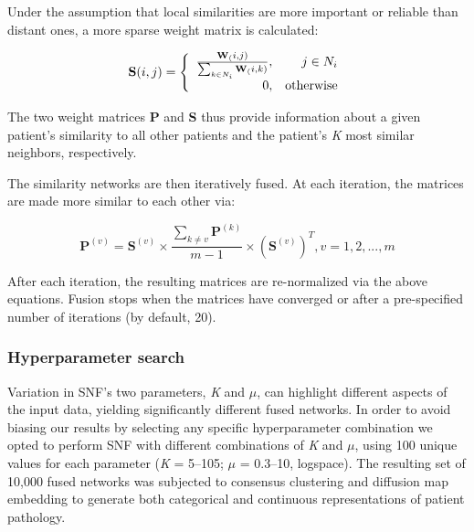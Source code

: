 \documentclass[12pt,aps,pra,reprint,showkeys]{revtex4-1}
\begin{document}
Under the assumption that local similarities are more important or reliable than distant ones, a more sparse weight matrix is calculated:

\begin{equation*}
    \mathbf{S}(i,j) =
     \left\{\begin{array}{r r}
       \frac{\mathbf{W}_(i,j)}
            {\sum_{k\in N_{i}}^{}\mathbf{W}_(i,k)} ,& j \in N_{i} \\
                                                 0 ,& \text{otherwise}
     \end{array}\right.
\end{equation*}

The two weight matrices \textbf{P} and \textbf{S} thus provide information about a given patient's similarity to all other patients and the patient's \emph{K} most similar neighbors, respectively.

The similarity networks are then iteratively fused.
At each iteration, the matrices are made more similar to each other via:

\begin{equation*}
   \mathbf{P}^{(v)} = \mathbf{S}^{(v)}
                      \times
                      \frac{\sum_{k\neq v}^{}\mathbf{P}^{(k)}}{m-1}
                      \times
                      (\mathbf{S}^{(v)})^{T},
                      v = 1, 2, ..., m
\end{equation*}

After each iteration, the resulting matrices are re-normalized via the above equations.
Fusion stops when the matrices have converged or after a pre-specified number of iterations (by default, 20).

\subsubsection*{Hyperparameter search}

Variation in SNF's two parameters, \emph{K} and $\mu$, can highlight different aspects of the input data, yielding significantly different fused networks.
In order to avoid biasing our results by selecting any specific hyperparameter combination we opted to perform SNF with different combinations of \emph{K} and $\mu$, using 100 unique values for each parameter (\emph{K} = 5--105; $\mu$ = 0.3--10, logspace).
The resulting set of 10,000 fused networks was subjected to consensus clustering and diffusion map embedding to generate both categorical and continuous representations of patient pathology.
\end{document}
